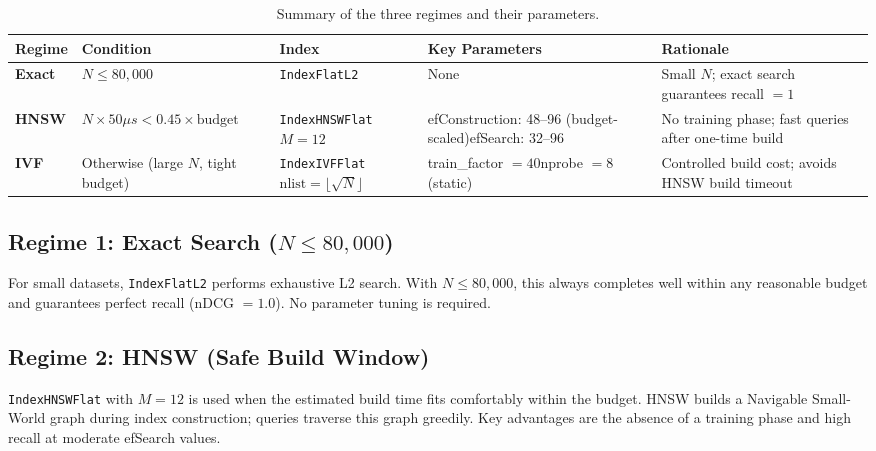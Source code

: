 \documentclass[11pt,a4paper]{article}
\newcommand{\code}[1]{\texttt{\small #1}}
\begin{document}
\begin{table}[H]
\centering
\renewcommand{\arraystretch}{1.35}
\caption{Summary of the three regimes and their parameters.}
\label{tab:regimes}
\begin{tabular}{>{\bfseries}p{1.6cm} p{3.8cm} p{2.5cm} p{3.2cm} p{2.6cm}}
\toprule
\rowcolor{tableheader}
\color{white}Regime &
\color{white}Condition &
\color{white}Index &
\color{white}Key Parameters &
\color{white}Rationale \\
\midrule
\rowcolor{green!10}
Exact   & $N \leq 80{,}000$ & \code{IndexFlatL2} & None &
  Small $N$; exact search guarantees recall $=1$ \\
\rowcolor{orange!10}
HNSW    & $N\!\times\!50\mu s < 0.45\!\times\!\text{budget}$ &
  \code{IndexHNSWFlat} $M=12$ &
  efConstruction: 48--96 (budget-scaled)\newline efSearch: 32--96 &
  No training phase; fast queries after one-time build \\
\rowcolor{red!10}
IVF     & Otherwise (large $N$, tight budget) &
  \code{IndexIVFFlat}\newline $\text{nlist}=\lfloor\sqrt{N}\rfloor$ &
  train\_factor $= 40$\newline nprobe $= 8$ (static) &
  Controlled build cost; avoids HNSW build timeout \\
\bottomrule
\end{tabular}
\end{table}

\subsection{Regime 1: Exact Search ($N \leq 80{,}000$)}

For small datasets, \code{IndexFlatL2} performs exhaustive L2 search. With
$N \leq 80{,}000$, this always completes well within any reasonable budget and
guarantees perfect recall (nDCG $= 1.0$). No parameter tuning is required.

\subsection{Regime 2: HNSW (Safe Build Window)}

\code{IndexHNSWFlat} with $M=12$ is used when the estimated build time fits
comfortably within the budget. HNSW builds a Navigable Small-World graph
during index construction; queries traverse this graph greedily. Key advantages
are the absence of a training phase and high recall at moderate efSearch values.
\end{document}
